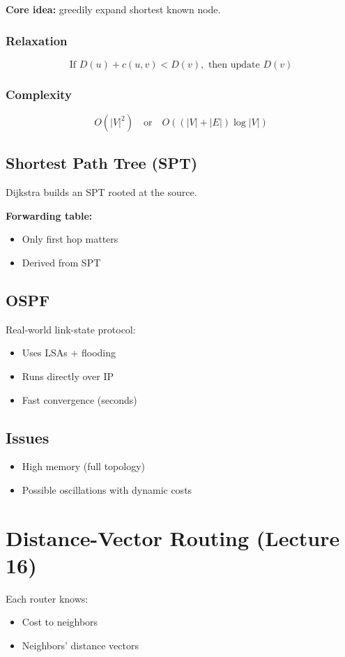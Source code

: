 \documentclass[11pt]{article}
\begin{document}
\textbf{Core idea:} greedily expand shortest known node.

\subsubsection*{Relaxation}
\[
\text{If } D(u) + c(u,v) < D(v), \text{ then update } D(v)
\]

\subsubsection*{Complexity}
\[
O(|V|^2) \quad \text{or} \quad O((|V|+|E|)\log|V|)
\]

\subsection{Shortest Path Tree (SPT)}
Dijkstra builds an SPT rooted at the source.

\textbf{Forwarding table:}
\begin{itemize}
    \item Only first hop matters
    \item Derived from SPT
\end{itemize}

\subsection{OSPF}
Real-world link-state protocol:
\begin{itemize}
    \item Uses LSAs + flooding
    \item Runs directly over IP
    \item Fast convergence (seconds)
\end{itemize}

\subsection{Issues}
\begin{itemize}
    \item High memory (full topology)
    \item Possible oscillations with dynamic costs
\end{itemize}

\section{Distance-Vector Routing (Lecture 16)}
Each router knows:
\begin{itemize}
    \item Cost to neighbors
    \item Neighbors' distance vectors
\end{itemize}
\end{document}
